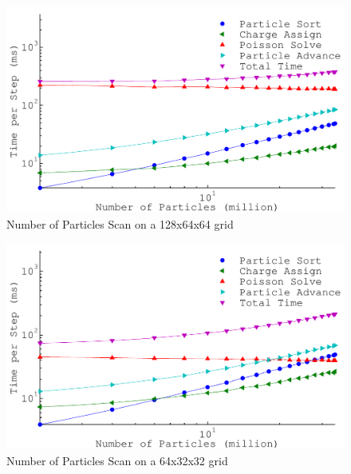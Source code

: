 \begin{figure}[h]
\begin{center}
\includegraphics[width=6in]{performance/nptclsize_scan128x64x64ons8bins.pdf}
\end{center}
\caption{Number of Particles Scan on a 128x64x64 grid}
\label{fig:nptclsize_scan128x64x64}
\end{figure}

\begin{figure}[h]
\begin{center}
\includegraphics[width=6in]{performance/nptclsize_scan64x32x32ons8bins.pdf}
\end{center}
\caption{Number of Particles Scan on a 64x32x32 grid}
\label{fig:nptclsize_scan64x32x32}
\end{figure}

